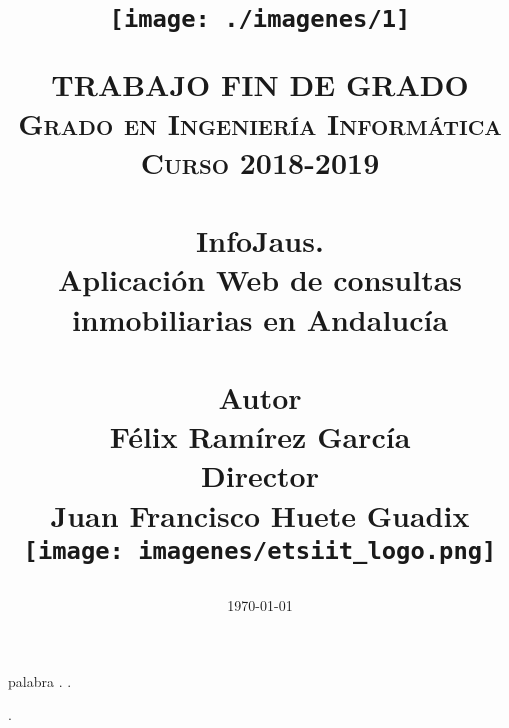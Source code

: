 
\usepackage{url}

\title{	
	\normalfont \normalsize
	\begin{figure}[htb]
		\centering
		\texttt{[image: ./imagenes/1]}
	\end{figure}
	\textsc{\textbf{TRABAJO FIN DE GRADO} \\ Grado en Ingeniería Informática \\ 
	Curso 2018-2019} \\ [25pt] 
	\horrule{0.5pt} \\[0.4cm]
	\huge InfoJaus. \\
	\huge Aplicación Web de consultas inmobiliarias en Andalucía
	\\ 
	\horrule{2pt} \\[0.5cm]
	\textbf{Autor}\\ {Félix Ramírez García}\\[1.0ex]
	\textbf{Director}\\ {Juan Francisco Huete Guadix}\\[0.5cm]
	\texttt{[image: imagenes/etsiit\_logo.png]}\\[0.1cm]
	\date{\normalsize\today} 
}





	
	\maketitle %
	
	\thispagestyle{empty} 	%
	\textcolor[rgb]{1.00,1.00,1.00}{palabra} 
	\newpage %
	\thispagestyle{empty} 
	\textcolor[rgb]{1.00,1.00,1.00}{.}  
	\newpage %
	\thispagestyle{empty} 
	\textcolor[rgb]{1.00,1.00,1.00}{.} 
	\newpage %
	
	
	
	
	\thispagestyle{empty} 
	\textcolor[rgb]{1.00,1.00,1.00}{.} 
	\newpage %
	
	
